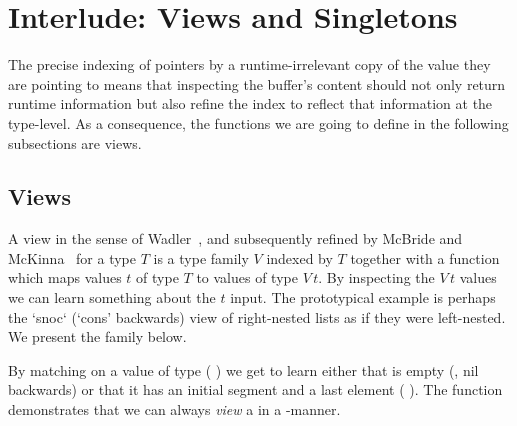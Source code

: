 
\section{Interlude: Views and Singletons}\label{sec:view}

The precise indexing of pointers by a runtime-irrelevant copy of the value
they are pointing to means that inspecting the buffer's content should
not only return runtime information but also refine the index to reflect
that information at the type-level.
%
As a consequence, the functions we are going to define in the following
subsections are views.

\subsection{Views}

A view
in the sense of Wadler~\citep{DBLP:conf/popl/Wadler87},
and subsequently refined by McBride and McKinna~\citep{DBLP:journals/jfp/McBrideM04}
for a type $T$ is a type family $V$ indexed by $T$ together
with a function which maps values $t$ of type $T$ to values of type
$V\,t$.
%
By inspecting the $V\,t$ values we can learn something about the
$t$ input.
%
The prototypical example is perhaps the `snoc` (`cons' backwards) view
of right-nested lists as if they were left-nested.
We present the  family below.


By matching on a value of type
( ) we get to learn
either that  is empty (, nil backwards)
or that it has an initial segment  and a last element
 ( \IdrisData{:<} ).
%
The function  demonstrates that we can always
\emph{view} a  in a -manner.


